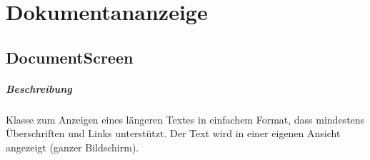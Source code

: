 \chapter{Dokumentananzeige}

\section{DocumentScreen}
\paragraph*{Beschreibung}
Klasse zum Anzeigen eines längeren Textes in einfachem Format, 
dass mindestens Überschriften und Links unterstützt.
Der Text wird in einer eigenen Ansicht angezeigt (ganzer Bildschirm).